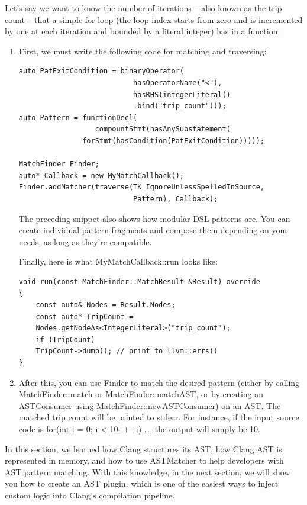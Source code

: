 Let's say we want to know the number of iterations – also known as the trip count – that a simple for loop (the loop index starts from zero and is incremented by one at each iteration and bounded by a literal integer) has in a function:

\begin{enumerate}
\item First, we must write the following code for matching and traversing:

\begin{lstlisting}[style=styleCXX]
auto PatExitCondition = binaryOperator(
                           hasOperatorName("<"),
                           hasRHS(integerLiteral()
                           .bind("trip_count")));
auto Pattern = functionDecl(
                  compountStmt(hasAnySubstatement(
               forStmt(hasCondition(PatExitCondition)))));
               
MatchFinder Finder;
auto* Callback = new MyMatchCallback();
Finder.addMatcher(traverse(TK_IgnoreUnlessSpelledInSource,
                           Pattern), Callback);
\end{lstlisting}

The preceding snippet also shows how modular DSL patterns are. You can create individual pattern fragments and compose them depending on your needs, as long as they're compatible.

Finally, here is what MyMatchCallback::run looks like:

\begin{lstlisting}[style=styleCXX]
void run(const MatchFinder::MatchResult &Result) override
{
	const auto& Nodes = Result.Nodes;
	const auto* TripCount =
	Nodes.getNodeAs<IntegerLiteral>("trip_count");
	if (TripCount)
	TripCount->dump(); // print to llvm::errs()
}
\end{lstlisting}

\item After this, you can use Finder to match the desired pattern (either by calling MatchFinder::match or MatchFinder::matchAST, or by creating an ASTConsumer using MatchFinder::newASTConsumer) on an AST. The matched trip count will be printed to stderr. For instance, if the input source code is for(int i = 0; i < 10; ++i) {…}, the output will simply be 10.
\end{enumerate}

In this section, we learned how Clang structures its AST, how Clang AST is represented in memory, and how to use ASTMatcher to help developers with AST pattern matching. With this knowledge, in the next section, we will show you how to create an AST plugin, which is one of the easiest ways to inject custom logic into Clang's compilation pipeline.





















